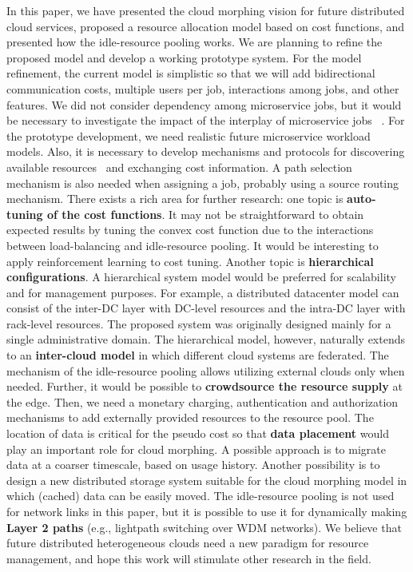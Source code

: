
In this paper, we have presented the cloud morphing vision for
future distributed cloud services,
proposed a resource allocation model based on cost functions,
and presented how the idle-resource pooling works.
We are planning to refine the proposed model and develop a working
prototype system.
For the model refinement,
the current model is simplistic so that we will add bidirectional
communication costs,
multiple users per job, interactions among jobs, and other features.
We did not consider dependency among microservice jobs, but it would be
necessary to investigate the impact of the interplay of microservice
jobs ~\cite{Suresh-SOA-SOCC2017}.
For the prototype development,
we need realistic future microservice workload models.
Also, it is necessary to develop mechanisms and protocols for
discovering available resources~\cite{Albrecht2008} and exchanging
cost information.
A path selection mechanism is also needed when assigning a job,
probably using a source routing mechanism.
There exists a rich area for further research:
one topic is {\bf auto-tuning of the cost functions}.
It may not be straightforward to obtain expected results by tuning the
convex cost function due to the interactions between load-balancing
and idle-resource pooling.
It would be interesting to apply reinforcement learning to cost
tuning.
Another topic is {\bf hierarchical configurations}.
A hierarchical system model would be preferred for scalability
and for management purposes.
For example, a distributed datacenter model can consist of
the inter-DC layer with DC-level resources and the intra-DC layer
with rack-level resources.
The proposed system was originally designed mainly for a single
administrative domain.
The hierarchical model, however, naturally extends to
an {\bf inter-cloud model} in which different cloud systems are
federated.
The mechanism of the idle-resource pooling allows utilizing external
clouds only when needed.
Further, it would be possible to {\bf crowdsource the resource supply}
at the edge. 
Then, we need a monetary charging, authentication and authorization
mechanisms to add externally provided resources to the resource pool.
The location of data is critical for the pseudo cost so that
{\bf data placement} would play an important role for cloud morphing. 
A possible approach is to migrate data at a coarser timescale, based
on usage history.
Another possibility is to design a new distributed storage system
suitable for the cloud morphing model in which (cached) data can be
easily moved.
The idle-resource pooling is not used for network links in this paper, but
it is possible to use it for dynamically making {\bf Layer 2 paths}
(e.g., lightpath switching over WDM networks).
We believe that future distributed heterogeneous clouds need a new
paradigm for resource management, and hope this work will stimulate
other research in the field.
